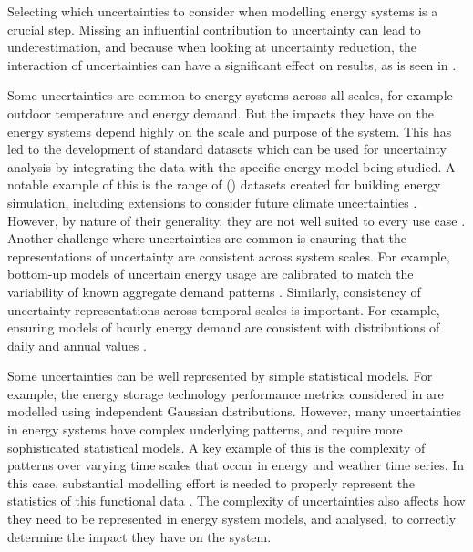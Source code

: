 Selecting which uncertainties to consider when modelling energy systems is a crucial step. Missing an influential contribution to uncertainty can lead to underestimation, and because when looking at uncertainty reduction, the interaction of uncertainties can have a significant effect on results, as is seen in .

Some uncertainties are common to energy systems across all scales, for example outdoor temperature and energy demand. But the impacts they have on the energy systems depend highly on the scale and purpose of the system. This has led to the development of standard datasets which can be used for uncertainty analysis by integrating the data with the specific energy model being studied. A notable example of this is the range of  () datasets  created for building energy simulation, including extensions to consider future climate uncertainties . However, by nature of their generality, they are not well suited to every use case .
Another challenge where uncertainties are common is ensuring that the representations of uncertainty are consistent across system scales. For example, bottom-up models of uncertain energy usage are calibrated to match the variability of known aggregate demand patterns . Similarly, consistency of uncertainty representations across temporal scales is important. For example, ensuring models of hourly energy demand are consistent with distributions of daily and annual values .

Some uncertainties can be well represented by simple statistical models. For example, the energy storage technology performance metrics considered in  are modelled using independent Gaussian distributions.
However, many uncertainties in energy systems have complex underlying patterns, and require more sophisticated statistical models. A key example of this is the complexity of patterns over varying time scales that occur in energy and weather time series. In this case, substantial modelling effort is needed to properly represent the statistics of this functional data .
The complexity of uncertainties also affects how they need to be represented in energy system models, and analysed, to correctly determine the impact they have on the system.

